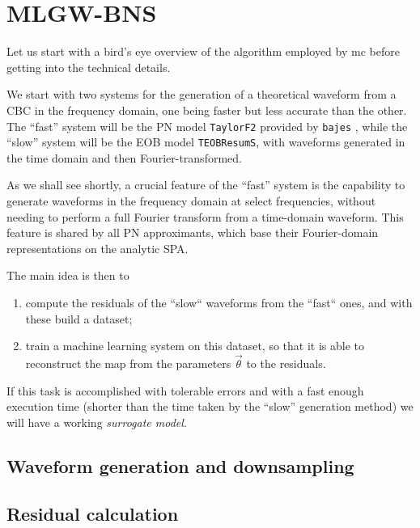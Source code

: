 \documentclass[main.tex]{subfiles}
\begin{document}
\section{MLGW-BNS}

Let us start with a bird's eye overview of the algorithm employed by \ac{mc} before getting into the technical details. 

We start with two systems for the generation of a theoretical waveform from a \ac{CBC} in the frequency domain, one being faster but less accurate than the other. 
The ``fast'' system will be the \ac{PN} model \texttt{TaylorF2} provided by \texttt{bajes} \cite[]{breschiTtBajesBayesian2021}, while the ``slow'' system will be the \ac{EOB} model \texttt{TEOBResumS}, with waveforms generated in the time domain and then Fourier-transformed. 

As we shall see shortly, a crucial feature of the ``fast'' system is the capability to generate waveforms in the frequency domain at select frequencies, without needing to perform a full Fourier transform from a time-domain waveform.
This feature is shared by all \ac{PN} approximants, which base their Fourier-domain representations on the analytic \ac{SPA}.

The main idea is then to 
\begin{enumerate}
    \item compute the residuals of the ``slow`` waveforms from the ``fast`` ones, and with these build a dataset;
    \item train a machine learning system on this dataset, so that it is able to reconstruct the map from the parameters \(\vec{\theta}\) to the residuals.
\end{enumerate}

If this task is accomplished with tolerable errors and with a fast enough execution time (shorter than the time taken by the ``slow'' generation method) we will have a working \emph{surrogate model}. 

\subsection{Waveform generation and downsampling}



\subsection{Residual calculation}
\end{document}

